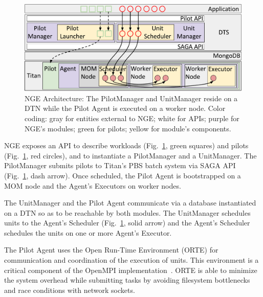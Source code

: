 \begin{figure}
  \centering
	\includegraphics[width=\columnwidth]{figures/rp_architecture_compact_atlaswms_paper.pdf}
	\vspace{-0.3in}
	\caption{NGE Architecture: The PilotManager and UnitManager reside on a
  	DTN while the Pilot Agent is executed on a worker node. Color coding:
  	gray for entities external to NGE\@; white for APIs; purple for NGE's
  	modules; green for pilots; yellow for module's components.}
\label{fig:arch-overview}
\end{figure}

NGE exposes an API to describe workloads (Fig.~\ref{fig:arch-overview}, green
squares) and pilots (Fig.~\ref{fig:arch-overview}, red circles), and to
instantiate a PilotManager and a UnitManager. The PilotManager submits pilots
to Titan's PBS batch system via SAGA API (Fig.~\ref{fig:arch-overview}, dash
arrow). Once scheduled, the Pilot Agent is bootstrapped on a MOM node and the
Agent's Executors on worker nodes.

The UnitManager and the Pilot Agent communicate via a database instantiated
on a DTN so as to be reachable by both modules. The UnitManager schedules
units to the Agent's Scheduler (Fig.~\ref{fig:arch-overview}, solid arrow)
and the Agent's Scheduler schedules the units on one or more Agent's
Executor.

The Pilot Agent uses the Open Run-Time Environment (ORTE) for communication
and coordination of the execution of units. This environment is a critical
component of the OpenMPI implementation~\cite{castain05:_open_rte}. ORTE is
able to minimize the system overhead while submitting tasks by avoiding
filesystem bottlenecks and race conditions with network sockets.